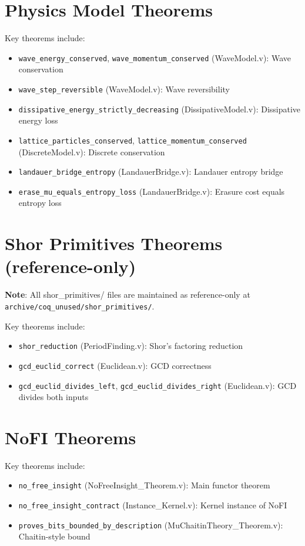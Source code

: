 \section{Physics Model Theorems}

Key theorems include:
\begin{itemize}
    \item \texttt{wave\_energy\_conserved}, \texttt{wave\_momentum\_conserved} (WaveModel.v): Wave conservation
    \item \texttt{wave\_step\_reversible} (WaveModel.v): Wave reversibility
    \item \texttt{dissipative\_energy\_strictly\_decreasing} (DissipativeModel.v): Dissipative energy loss
    \item \texttt{lattice\_particles\_conserved}, \texttt{lattice\_momentum\_conserved} (DiscreteModel.v): Discrete conservation
    \item \texttt{landauer\_bridge\_entropy} (LandauerBridge.v): Landauer entropy bridge
    \item \texttt{erase\_mu\_equals\_entropy\_loss} (LandauerBridge.v): Erasure cost equals entropy loss
\end{itemize}

\section{Shor Primitives Theorems (reference-only)}

\textbf{Note}: All shor\_primitives/ files are maintained as reference-only at \texttt{archive/coq\_unused/shor\_primitives/}.

Key theorems include:
\begin{itemize}
    \item \texttt{shor\_reduction} (PeriodFinding.v): Shor's factoring reduction
    \item \texttt{gcd\_euclid\_correct} (Euclidean.v): GCD correctness
    \item \texttt{gcd\_euclid\_divides\_left}, \texttt{gcd\_euclid\_divides\_right} (Euclidean.v): GCD divides both inputs
\end{itemize}

\section{NoFI Theorems}

Key theorems include:
\begin{itemize}
    \item \texttt{no\_free\_insight} (NoFreeInsight\_Theorem.v): Main functor theorem
    \item \texttt{no\_free\_insight\_contract} (Instance\_Kernel.v): Kernel instance of NoFI
    \item \texttt{proves\_bits\_bounded\_by\_description} (MuChaitinTheory\_Theorem.v): Chaitin-style bound
\end{itemize}

